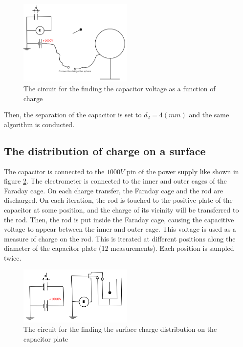 \begin{figure}[H]
  \centering
  \includegraphics[width=0.5\textwidth]{capacitors/img/capacitor_voltage.png}
  \caption{The circuit for the finding the capacitor voltage as a function of charge}
  \label{methods:fig:capacitor_voltage}
\end{figure}

Then, the separation of the capacitor is set to $d_{2} = 4 (mm)$ and the same algorithm is conducted.

\subsection{The distribution of charge on a surface}

The capacitor is connected to the $1000V$ pin of the power supply like shown in figure \ref{methods:fig:distribution}. The electrometer is connected to the inner and outer cages of the Faraday cage. On each charge transfer, the Faraday cage and the rod are discharged. On each iteration, the rod is touched to the positive plate of the capacitor at some position, and the charge of its vicinity will be transferred to the rod. Then, the rod is put inside the Faraday cage, causing the capacitive voltage to appear between the inner and outer cage. This voltage is used as a measure of charge on the rod. This is iterated at different positions along the diameter of the capacitor plate (12 measurements). Each position is sampled twice.

\begin{figure}[H]
  \centering
  \includegraphics[width=0.5\textwidth]{capacitors/img/distribution.png}
  \caption{The circuit for the finding the surface charge distribution on the capacitor plate}
  \label{methods:fig:distribution}
\end{figure}

